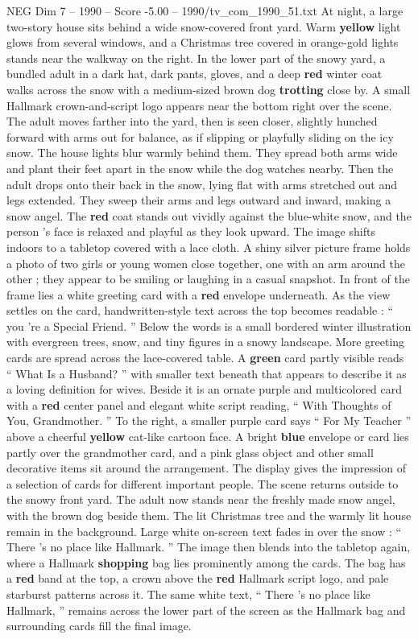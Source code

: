 \begin{textsample}{NEG Dim 7 – 1990 – Score -5.00 – 1990/tv\_com\_1990\_51.txt}  \label{ex:f7_neg_032}
At night, a large two-story house sits behind a wide snow-covered front yard.
Warm \textbf{yellow} light glows from several windows, and a Christmas tree covered in orange-gold lights stands near the walkway on the right.
In the lower part of the snowy yard, a bundled adult in a dark hat, dark pants, gloves, and a deep \textbf{red} winter coat walks across the snow with a medium-sized brown dog \textbf{trotting} close by.
A small Hallmark crown-and-script logo appears near the bottom right over the scene.
The adult moves farther into the yard, then is seen closer, slightly hunched forward with arms out for balance, as if slipping or playfully sliding on the icy snow.
The house lights blur warmly behind them.
They spread both arms wide and plant their feet apart in the snow while the dog watches nearby.
Then the adult drops onto their back in the snow, lying flat with arms stretched out and legs extended.
They sweep their arms and legs outward and inward, making a snow angel.
The \textbf{red} coat stands out vividly against the blue-white snow, and the person ’s face is relaxed and playful as they look upward.
The image shifts indoors to a tabletop covered with a lace cloth.
A shiny silver picture frame holds a photo of two girls or young women close together, one with an arm around the other ; they appear to be smiling or laughing in a casual snapshot.
In front of the frame lies a white greeting card with a \textbf{red} envelope underneath.
As the view settles on the card, handwritten-style text across the top becomes readable : “ you ’re a Special Friend. ” Below the words is a small bordered winter illustration with evergreen trees, snow, and tiny figures in a snowy landscape.
More greeting cards are spread across the lace-covered table.
A \textbf{green} card partly visible reads “ What Is a Husband? ” with smaller text beneath that appears to describe it as a loving definition for wives.
Beside it is an ornate purple and multicolored card with a \textbf{red} center panel and elegant white script reading, “ With Thoughts of You, Grandmother. ” To the right, a smaller purple card says “ For My Teacher ” above a cheerful \textbf{yellow} cat-like cartoon face.
A bright \textbf{blue} envelope or card lies partly over the grandmother card, and a pink glass object and other small decorative items sit around the arrangement.
The display gives the impression of a selection of cards for different important people.
The scene returns outside to the snowy front yard.
The adult now stands near the freshly made snow angel, with the brown dog beside them.
The lit Christmas tree and the warmly lit house remain in the background.
Large white on-screen text fades in over the snow : “ There ’s no place like Hallmark. ” The image then blends into the tabletop again, where a Hallmark \textbf{shopping} bag lies prominently among the cards.
The bag has a \textbf{red} band at the top, a crown above the \textbf{red} Hallmark script logo, and pale starburst patterns across it.
The same white text, “ There ’s no place like Hallmark, ” remains across the lower part of the screen as the Hallmark bag and surrounding cards fill the final image.

\end{textsample}
